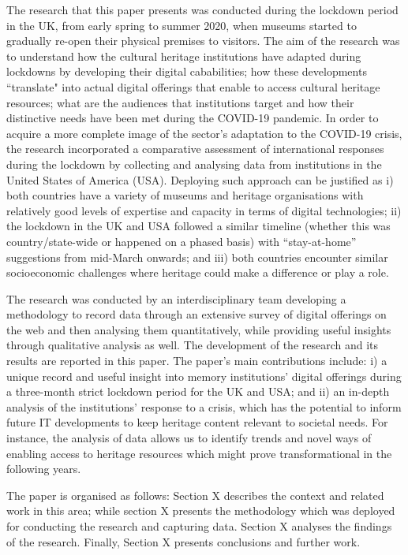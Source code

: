 \documentclass{egpubl}
\begin{document}
The research that this paper presents was conducted during the lockdown period in the UK, from early spring to summer 2020, when museums started to gradually re-open their physical premises to visitors. The aim of the research was to understand how the cultural heritage institutions have adapted during lockdowns by developing their digital cababilities; how these developments ``translate" into actual digital offerings that enable to access cultural heritage resources; what are the audiences that institutions target and how their distinctive needs have been met during the COVID-19 pandemic. In order to acquire a more complete image of the sector's adaptation to the COVID-19 crisis, the research incorporated a comparative assessment of international responses during the lockdown by collecting and analysing data from institutions in the United States of America (USA). Deploying such approach can be justified as i) both countries have a variety of museums and heritage organisations with relatively good levels of expertise and capacity in terms of digital technologies; ii) the lockdown in the UK and USA followed a similar timeline (whether this was country/state-wide or happened on a phased basis) with ``stay-at-home'' suggestions from mid-March onwards; and iii) both countries encounter similar socioeconomic challenges where heritage could make a difference or play a role.

The research was conducted by an interdisciplinary team developing a methodology to record data through an extensive survey of digital offerings on the web and then analysing them quantitatively, while providing useful insights through qualitative analysis as well. The development of the research and its results are reported in this paper. The paper’s main contributions include: i) a unique record and useful insight into memory institutions’ digital offerings during a three-month strict lockdown period for the UK and USA; and ii) an in-depth analysis of the institutions' response to a crisis, which has the potential to inform future IT developments to keep heritage content relevant to societal needs. For instance, the analysis of data allows us to identify trends and novel ways of enabling access to heritage resources which might prove transformational in the following years.

The paper is organised as follows: Section X describes the context and related work in this area; while section X presents the methodology which was deployed for conducting the research and capturing data. Section X analyses the findings of the research. Finally, Section X presents conclusions and further work.  
\end{document}
